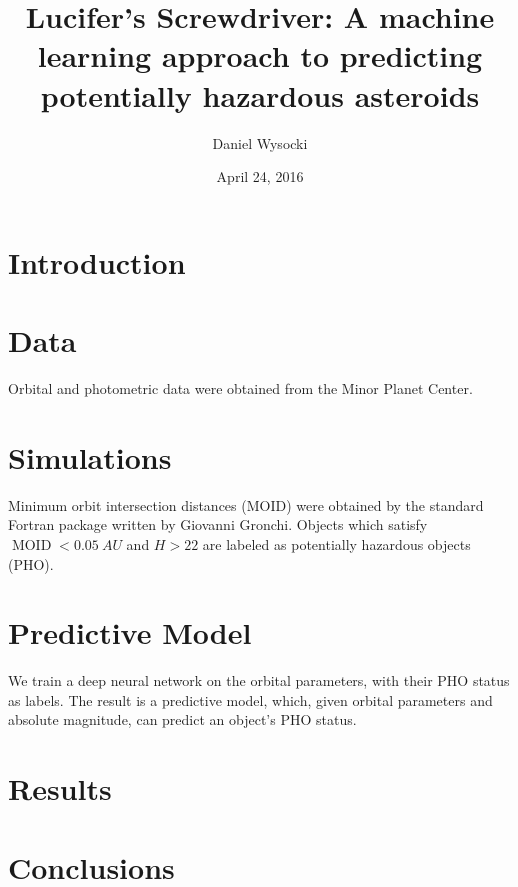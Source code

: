 \documentclass[12pt]{article}
\author{Daniel Wysocki}
\title{
  Lucifer's Screwdriver:
  A machine learning approach to predicting potentially hazardous asteroids
}
\date{April 24, 2016}
\DeclareMathOperator{\MOID}{MOID}
\begin{document}
\maketitle

\begin{abstract}



\end{abstract}


\section{Introduction}
\label{sec:intro}



\section{Data}
\label{sec:data}

Orbital and photometric data were obtained from the Minor Planet Center.



\section{Simulations}
\label{sec:sim}

Minimum orbit intersection distances (MOID) were obtained by the standard Fortran package written by Giovanni Gronchi. Objects which satisfy $\MOID < \SI{0.05}{AU}$ and $H > 22$ are labeled as potentially hazardous objects (PHO).



\section{Predictive Model}
\label{sec:model}

We train a deep neural network on the orbital parameters, with their PHO status as labels. The result is a predictive model, which, given orbital parameters and absolute magnitude, can predict an object's PHO status.



\section{Results}
\label{sec:results}





\section{Conclusions}
\label{sec:conclusions}
\end{document}

